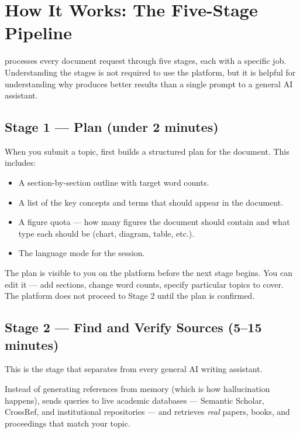 \section{How It Works: The Five-Stage Pipeline}
\label{sec:how_it_works}

\sys{} processes every document request through five stages, each with a specific job.
Understanding the stages is not required to use the platform, but it is helpful
for understanding why \sys{} produces better results than a single prompt to a
general AI assistant.



\subsection{Stage 1 — Plan (under 2 minutes)}

When you submit a topic, \sys{} first builds a structured plan for the document.
This includes:

\begin{itemize}
  \item A section-by-section outline with target word counts.
  \item A list of the key concepts and terms that should appear in the document.
  \item A figure quota — how many figures the document should contain and what type
        each should be (chart, diagram, table, etc.).
  \item The language mode for the session.
\end{itemize}

The plan is visible to you on the platform before the next stage begins.
You can edit it — add sections, change word counts, specify particular topics to cover.
The platform does not proceed to Stage 2 until the plan is confirmed.

\subsection{Stage 2 — Find and Verify Sources (5–15 minutes)}

This is the stage that separates \sys{} from every general AI writing assistant.

Instead of generating references from memory (which is how hallucination happens),
\sys{} sends queries to live academic databases — Semantic Scholar, CrossRef,
and institutional repositories — and retrieves \emph{real} papers, books, and
proceedings that match your topic.

